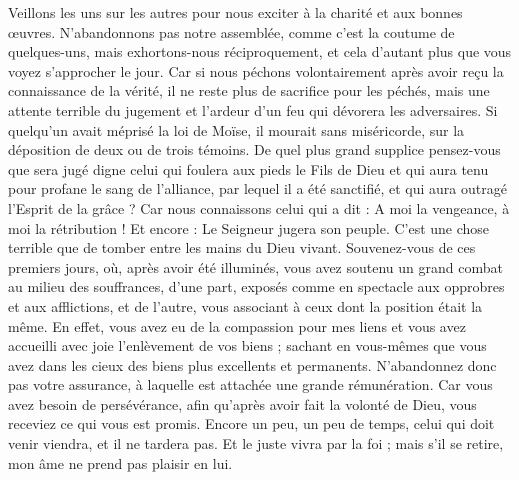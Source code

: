 \begin{multicols}{2}
Veillons les uns sur les autres pour nous exciter à la charité et aux bonnes œuvres.
N’abandonnons pas notre assemblée, comme c’est la coutume de quelques-uns, mais exhortons-nous réciproquement, et cela d'autant plus que vous voyez s’approcher le jour.
Car si nous péchons volontairement après avoir reçu la connaissance de la vérité, il ne reste plus de sacrifice pour les péchés,
mais une attente terrible du jugement et l'ardeur d'un feu qui dévorera les adversaires.
Si quelqu'un avait méprisé la loi de Moïse, il mourait sans miséricorde, sur la déposition de deux ou de trois témoins.
De quel plus grand supplice pensez-vous que sera jugé digne celui qui foulera aux pieds le Fils de Dieu et qui aura tenu pour profane le sang de l'alliance, par lequel il a été sanctifié, et qui aura outragé l'Esprit de la grâce ?
Car nous connaissons celui qui a dit : A moi la vengeance, à moi la rétribution ! Et encore : Le Seigneur jugera son peuple.
C'est une chose terrible que de tomber entre les mains du Dieu vivant.
Souvenez-vous de ces premiers jours, où, après avoir été illuminés, vous avez soutenu un grand combat au milieu des souffrances,
d'une part, exposés comme en spectacle aux opprobres et aux afflictions, et de l'autre, vous associant à ceux dont la position était la même.
En effet, vous avez eu de la compassion pour mes liens et vous avez accueilli avec joie l'enlèvement de vos biens ; sachant en vous-mêmes que vous avez dans les cieux des biens plus excellents et permanents.
N’abandonnez donc pas votre assurance, à laquelle est attachée une grande rémunération.
Car vous avez besoin de persévérance, afin qu'après avoir fait la volonté de Dieu, vous receviez ce qui vous est promis.
Encore un peu, un peu de temps, celui qui doit venir viendra, et il ne tardera pas.
Et le juste vivra par la foi ; mais s’il se retire, mon âme ne prend pas plaisir en lui.

\end{multicols}
